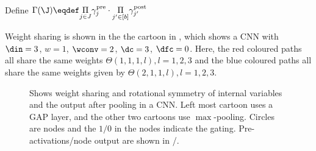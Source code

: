 \begin{definition}
Define $\Gamma(\J)\eqdef \underset{j\in J}\Pi \gamma^{\text{pre}}_j \cdot \underset{j'\in [b]}\Pi \gamma^{\text{post}}_{j'}$
\end{definition}
 Weight sharing is shown in the the cartoon in , which shows a CNN with $\din=3$, $w=1$, $\wconv=2$, $\dc=3$, $\dfc=0$. Here, the red coloured paths all share the same weights  $\Theta(1,1,1,l), l=1,2,3$ and the blue coloured paths all share the same weights given by $\Theta(2,1,1,l), l=1,2,3$. 
\FloatBarrier
 \begin{figure}[h]
\begin{minipage}{0.33\columnwidth}
\end{minipage}
\begin{minipage}{0.33\columnwidth}
\end{minipage}
\begin{minipage}{0.33\columnwidth}
\end{minipage}
\caption{\small{Shows weight sharing and rotational symmetry of internal variables and the output after pooling in a CNN. Left most cartoon uses a GAP layer, and the other two cartoons use $\max$-pooling. Circles are nodes and the $1/0$ in the nodes indicate the gating. Pre-activations/node output are shown in {\color{chocolate}{brown}}/{\color{electricpurple}{purple}}.}}
\label{fig:pathshare}
\end{figure}

